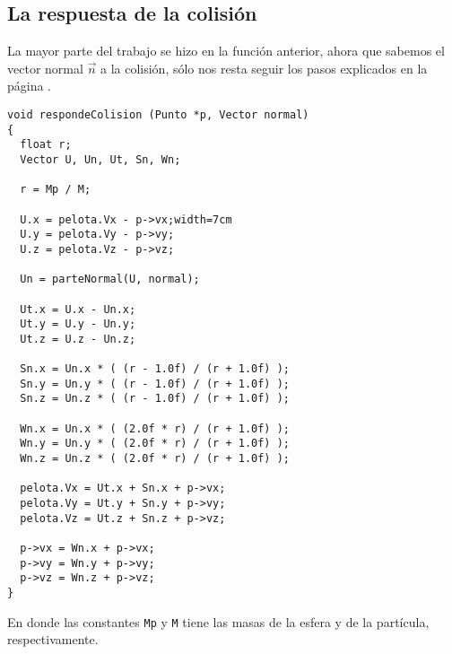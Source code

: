 \subsection{La respuesta de la colisión}
La mayor parte del trabajo se hizo en la función anterior, ahora que sabemos el vector normal $\vec{n}$ a la colisión, sólo nos resta seguir los pasos explicados en la página \pageref{alg:elasmov}.
\begin{verbatim}
void respondeColision (Punto *p, Vector normal)
{
  float r;
  Vector U, Un, Ut, Sn, Wn;

  r = Mp / M;

  U.x = pelota.Vx - p->vx;width=7cm
  U.y = pelota.Vy - p->vy;
  U.z = pelota.Vz - p->vz;

  Un = parteNormal(U, normal);

  Ut.x = U.x - Un.x;
  Ut.y = U.y - Un.y;
  Ut.z = U.z - Un.z;

  Sn.x = Un.x * ( (r - 1.0f) / (r + 1.0f) );
  Sn.y = Un.y * ( (r - 1.0f) / (r + 1.0f) );
  Sn.z = Un.z * ( (r - 1.0f) / (r + 1.0f) );

  Wn.x = Un.x * ( (2.0f * r) / (r + 1.0f) );
  Wn.y = Un.y * ( (2.0f * r) / (r + 1.0f) );
  Wn.z = Un.z * ( (2.0f * r) / (r + 1.0f) );

  pelota.Vx = Ut.x + Sn.x + p->vx;
  pelota.Vy = Ut.y + Sn.y + p->vy;
  pelota.Vz = Ut.z + Sn.z + p->vz;

  p->vx = Wn.x + p->vx;
  p->vy = Wn.y + p->vy;
  p->vz = Wn.z + p->vz;
}
\end{verbatim}
En donde las constantes \verb|Mp| y \verb|M| tiene las masas de la esfera y de la partícula, respectivamente.
